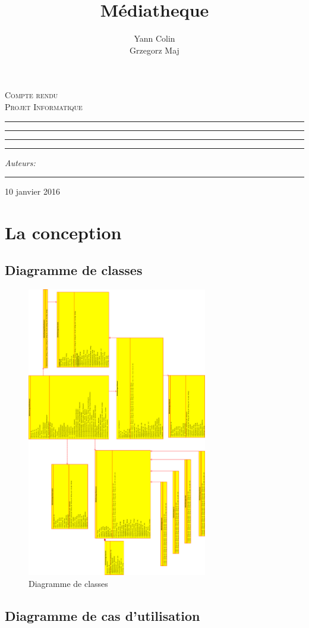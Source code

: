 \documentclass[10pt, a4paper]{article}
\author{Yann Colin \\Grzegorz Maj}
\title{Médiatheque}
\makeatletter
\newcommand{\linia}{\rule{\linewidth}{0.4mm}}
\def\maketitle{%
\begin{titlepage}
	\begin{center}
		\LARGE
		\textsc{Compte rendu \\ Projet Informatique}
	\end{center}

	\vspace{3cm}

	\begin{center}\leavevmode
      \hrule
    \vskip 1pt
	\linia
	\vskip 0.5cm
	\Huge \textsc{\@title}\par

	\vskip 0.5cm
      	\linia
      \vskip 1pt
      \hrule

	\vskip 2mm

	\vspace{1.5cm}
	\begin{flushright}
		\begin{minipage}{5cm}
			\textit{\normalsize Auteurs:}\\
			\Large \textit{\@author} \par
			\vskip 2pt
			\hrule
			
		\end{minipage}
	\end{flushright}
    

	\end{center}%
	\vspace*{\stretch{6}}
    \begin{center}
    10 janvier 2016
    \end{center}
\end{titlepage}
	}
\makeatother
\begin{document}

    \maketitle
    
    \tableofcontents
    \newpage
    
     \section{La conception}
     
	     \subsection{Diagramme de classes}
		\begin{figure}[ht]

	    \centering
	    		\includegraphics[width=0.7\textwidth]{graphics/class90.eps}
	    		\caption{Diagramme de classes}
	    		\label{fig:label}
	    	\end{figure}
	    	\newpage
     
    		 \subsection{Diagramme de cas d'utilisation}
    		 
\end{document}
